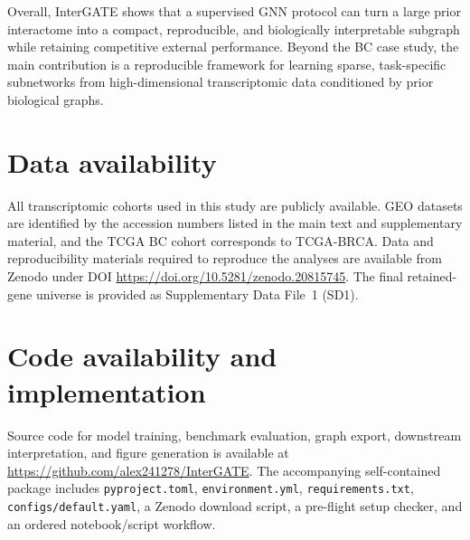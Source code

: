 \documentclass[unnumsec,webpdf,modern,large]{oup-authoring-template}
\begin{document}
Overall, InterGATE shows that a supervised GNN protocol can turn a large prior interactome into a compact, reproducible, and biologically interpretable subgraph while retaining competitive external performance. Beyond the BC case study, the main contribution is a reproducible framework for learning sparse, task-specific subnetworks from high-dimensional transcriptomic data conditioned by prior biological graphs.


\section*{Data availability}

All transcriptomic cohorts used in this study are publicly available. GEO datasets are identified by the accession numbers listed in the main text and supplementary material, and the TCGA BC cohort corresponds to TCGA-BRCA. Data and reproducibility materials required to reproduce the analyses are available from Zenodo under DOI \url{https://doi.org/10.5281/zenodo.20815745}. The final retained-gene universe is provided as Supplementary Data File~1 (SD1).

\section*{Code availability and implementation}

Source code for model training, benchmark evaluation, graph export, downstream interpretation, and figure generation is available at \url{https://github.com/alex241278/InterGATE}. The accompanying self-contained package includes \texttt{pyproject.toml}, \texttt{environment.yml}, \texttt{requirements.txt}, \texttt{configs/default.yaml}, a Zenodo download script, a pre-flight setup checker, and an ordered notebook/script workflow.

\end{document}
